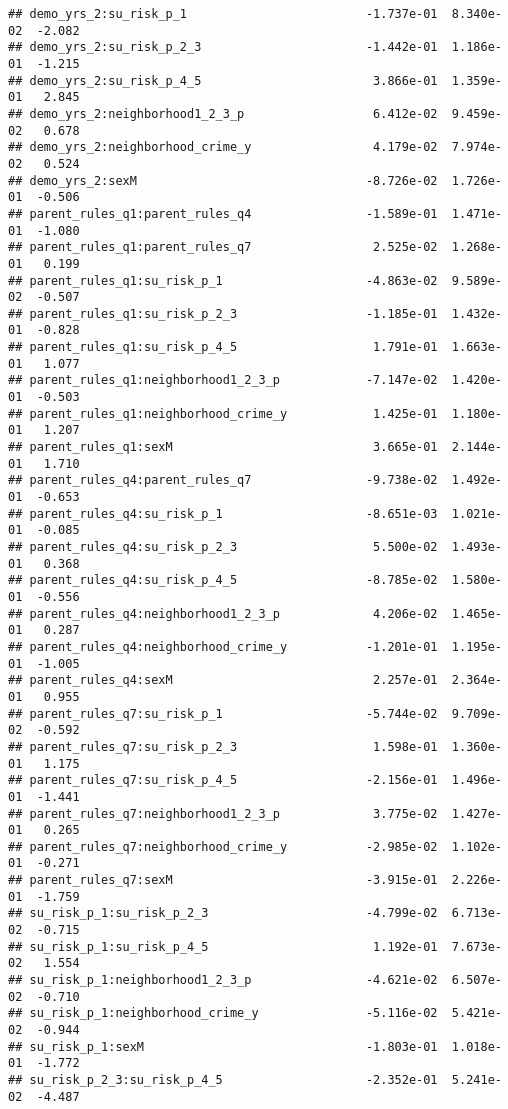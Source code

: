 \documentclass[
]{article}
\begin{document}
\begin{verbatim}
## demo_yrs_2:su_risk_p_1                         -1.737e-01  8.340e-02  -2.082
## demo_yrs_2:su_risk_p_2_3                       -1.442e-01  1.186e-01  -1.215
## demo_yrs_2:su_risk_p_4_5                        3.866e-01  1.359e-01   2.845
## demo_yrs_2:neighborhood1_2_3_p                  6.412e-02  9.459e-02   0.678
## demo_yrs_2:neighborhood_crime_y                 4.179e-02  7.974e-02   0.524
## demo_yrs_2:sexM                                -8.726e-02  1.726e-01  -0.506
## parent_rules_q1:parent_rules_q4                -1.589e-01  1.471e-01  -1.080
## parent_rules_q1:parent_rules_q7                 2.525e-02  1.268e-01   0.199
## parent_rules_q1:su_risk_p_1                    -4.863e-02  9.589e-02  -0.507
## parent_rules_q1:su_risk_p_2_3                  -1.185e-01  1.432e-01  -0.828
## parent_rules_q1:su_risk_p_4_5                   1.791e-01  1.663e-01   1.077
## parent_rules_q1:neighborhood1_2_3_p            -7.147e-02  1.420e-01  -0.503
## parent_rules_q1:neighborhood_crime_y            1.425e-01  1.180e-01   1.207
## parent_rules_q1:sexM                            3.665e-01  2.144e-01   1.710
## parent_rules_q4:parent_rules_q7                -9.738e-02  1.492e-01  -0.653
## parent_rules_q4:su_risk_p_1                    -8.651e-03  1.021e-01  -0.085
## parent_rules_q4:su_risk_p_2_3                   5.500e-02  1.493e-01   0.368
## parent_rules_q4:su_risk_p_4_5                  -8.785e-02  1.580e-01  -0.556
## parent_rules_q4:neighborhood1_2_3_p             4.206e-02  1.465e-01   0.287
## parent_rules_q4:neighborhood_crime_y           -1.201e-01  1.195e-01  -1.005
## parent_rules_q4:sexM                            2.257e-01  2.364e-01   0.955
## parent_rules_q7:su_risk_p_1                    -5.744e-02  9.709e-02  -0.592
## parent_rules_q7:su_risk_p_2_3                   1.598e-01  1.360e-01   1.175
## parent_rules_q7:su_risk_p_4_5                  -2.156e-01  1.496e-01  -1.441
## parent_rules_q7:neighborhood1_2_3_p             3.775e-02  1.427e-01   0.265
## parent_rules_q7:neighborhood_crime_y           -2.985e-02  1.102e-01  -0.271
## parent_rules_q7:sexM                           -3.915e-01  2.226e-01  -1.759
## su_risk_p_1:su_risk_p_2_3                      -4.799e-02  6.713e-02  -0.715
## su_risk_p_1:su_risk_p_4_5                       1.192e-01  7.673e-02   1.554
## su_risk_p_1:neighborhood1_2_3_p                -4.621e-02  6.507e-02  -0.710
## su_risk_p_1:neighborhood_crime_y               -5.116e-02  5.421e-02  -0.944
## su_risk_p_1:sexM                               -1.803e-01  1.018e-01  -1.772
## su_risk_p_2_3:su_risk_p_4_5                    -2.352e-01  5.241e-02  -4.487

\end{verbatim}
\end{document}

